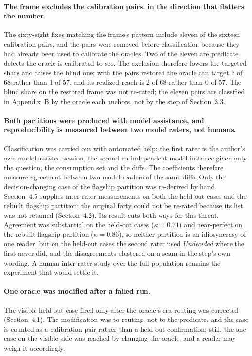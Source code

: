 \paragraph{The frame excludes the calibration pairs, in the direction that flatters the
number.}
The sixty-eight fixes matching the frame's pattern include eleven of the sixteen
calibration pairs, and the pairs were removed before classification because they had
already been used to calibrate the oracles. Two of the eleven are predicate defects the
oracle is calibrated to see. The exclusion therefore lowers the targeted share and
raises the blind one: with the pairs restored the oracle can target 3 of 68 rather than
1 of 57, and its realized reach is 2 of 68 rather than 0 of 57. The blind share on the
restored frame was not re-rated; the eleven pairs are classified in Appendix~B by the
oracle each anchors, not by the step of Section~3.3.

\paragraph{Both partitions were produced with model assistance, and reproducibility is
measured between two model raters, not humans.}
Classification was carried out with automated help: the first rater is the author's own
model-assisted session, the second an independent model instance given only the
question, the consumption set and the diffs. The coefficients therefore measure
agreement between two model readers of the same diffs. Only the decision-changing
case of the flagship partition was re-derived by hand. Section~4.5 supplies
inter-rater measurements on both the held-out cases and the rebuilt flagship
partition; the original forty could not be re-rated because its list was not
retained (Section~4.2). Its result cuts both
ways for this threat. Agreement was substantial on the held-out cases ($\kappa =
0.71$) and near-perfect on the rebuilt flagship partition ($\kappa = 0.86$), so neither
partition is an idiosyncrasy of one reader; but on the held-out cases the second rater
used \emph{Undecided} where the first never did, and the disagreements clustered on a
seam in the step's own wording.
A human inter-rater study over the full population remains the experiment that would
settle it.

\paragraph{One oracle was modified after a failed run.}
The visible held-out case fired only after the oracle's era routing was corrected
(Section~4.1). The modification was to routing, not to the predicate, and the case is
counted as a calibration pair rather than a held-out confirmation; still, the one case
on the visible side was reached by changing the oracle, and a reader may weigh it
accordingly.

